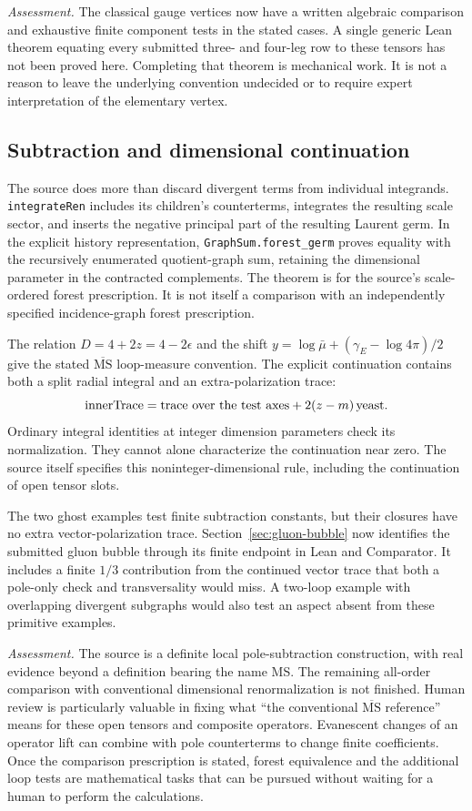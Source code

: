 \documentclass[11pt]{article}
\newcommand{\MS}{\overline{\mathrm{MS}}}
\newcommand{\code}[1]{{\small\nolinkurl{#1}}}
\begin{document}
\emph{Assessment.} The classical gauge vertices now have a written algebraic
comparison and exhaustive finite component tests in the stated cases.
A single generic Lean theorem equating every submitted three- and four-leg
row to these tensors has not been proved here. Completing that theorem is
mechanical work. It is not a reason to leave the underlying convention
undecided or to require expert interpretation of the elementary vertex.

\subsection{Subtraction and dimensional continuation}

The source does more than discard divergent terms from individual
integrands. \code{integrateRen} includes its children's counterterms,
integrates the resulting scale sector, and inserts the negative principal
part of the resulting Laurent germ. In the explicit history representation,
\code{GraphSum.forest_germ} proves equality with the recursively enumerated
quotient-graph sum, retaining the dimensional parameter in the contracted
complements. The theorem is for the source's scale-ordered forest
prescription. It is not itself a comparison with an independently specified
incidence-graph forest prescription.

The relation $D=4+2z=4-2\epsilon$ and the shift
$y=\log\bar\mu+(\gamma_E-\log4\pi)/2$ give the stated
$\MS$ loop-measure convention. The explicit continuation contains both
a split radial integral and an extra-polarization trace:
\[
 \mathrm{innerTrace}=\hbox{trace over the test axes}
                   +2(z-m)\,\mathrm{yeast}.
\]
Ordinary integral identities at integer dimension parameters check its
normalization. They cannot alone characterize the continuation near zero.
The source itself specifies this noninteger-dimensional rule, including
the continuation of open tensor slots.

The two ghost examples test finite subtraction constants, but their closures have no extra vector-polarization trace. Section~\ref{sec:gluon-bubble} now identifies the submitted gluon bubble through its finite endpoint in Lean and Comparator. It includes a finite $1/3$ contribution from the continued vector trace that both a pole-only check and transversality would miss. A two-loop example with overlapping divergent subgraphs would also test an aspect absent from these primitive examples.

\emph{Assessment.} The source is a definite local pole-subtraction
construction, with real evidence beyond a definition bearing the name MS.
The remaining all-order comparison with conventional dimensional
renormalization is not finished. Human review is particularly valuable in
fixing what ``the conventional $\MS$ reference'' means for these open
tensors and composite operators. Evanescent changes of an operator lift
can combine with pole counterterms to change finite coefficients. Once
the comparison prescription is stated, forest equivalence and the
additional loop tests are mathematical tasks that can be pursued without
waiting for a human to perform the calculations.
\end{document}
